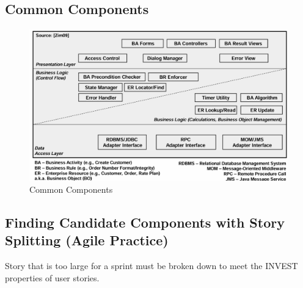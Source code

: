 \documentclass[../Main.tex]{subfiles}
\begin{document}
\newpage
\subsection{Common Components}
\begin{figure}[H]
    \centering
    \includegraphics[angle=90,height=1.2\textwidth]{Images/commoncomponents.png}
    \caption{Common Components}
\end{figure}
\newpage

\subsection{Finding Candidate Components with Story Splitting (Agile Practice)}
Story that is too large for a sprint must be broken down to meet the INVEST properties of user stories.

\end{document}

